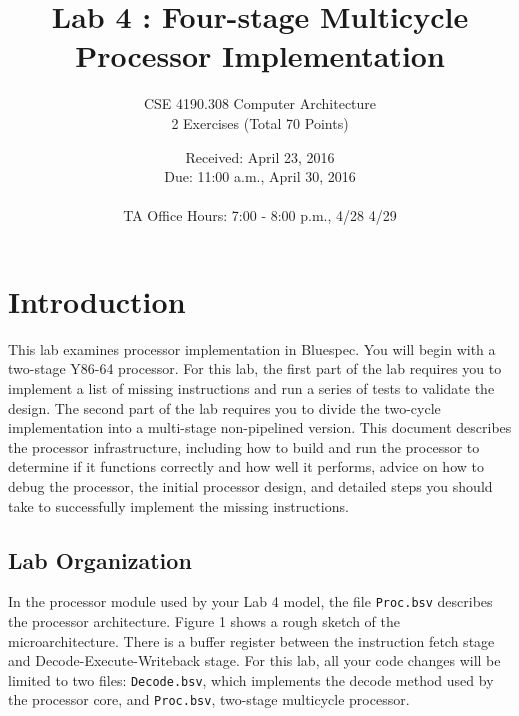 \documentclass{article}
\begin{document}
\title{Lab 4 : Four-stage Multicycle Processor Implementation}   %
\author{CSE 4190.308 Computer Architecture \\ 2 Exercises (Total 70 Points) }         
\date{Received: April 23, 2016 \\Due: 11:00 a.m., April 30, 2016\\ \ \\ TA Office
Hours: 7:00 - 8:00 p.m., 4/28 4/29}    %
\maketitle

\section{Introduction}

This lab examines processor implementation in Bluespec. You will begin with a two-stage Y86-64
processor. For this lab, the first part of the lab requires you to implement a list of missing instructions 
and run a series of tests to validate the design. The second part of the lab requires you to divide 
the two-cycle implementation into a multi-stage non-pipelined version.
This document describes the processor infrastructure, including how to build and run the processor 
to determine if it functions correctly and how well it performs, advice on how to debug the
processor, the initial processor design, and detailed steps you should take to successfully implement
the missing instructions.

\subsection{Lab Organization}
In the processor module used by your Lab 4 model, the file \texttt{Proc.bsv} describes the
processor architecture. Figure 1 shows a rough sketch of the microarchitecture. 
There is a buffer register between the instruction fetch
stage and Decode-Execute-Writeback stage. For this lab, all your code changes will be limited to two
files: \texttt{Decode.bsv}, which implements the decode method used by the processor
core, and \texttt{Proc.bsv}, two-stage multicycle processor.
\end{document}

